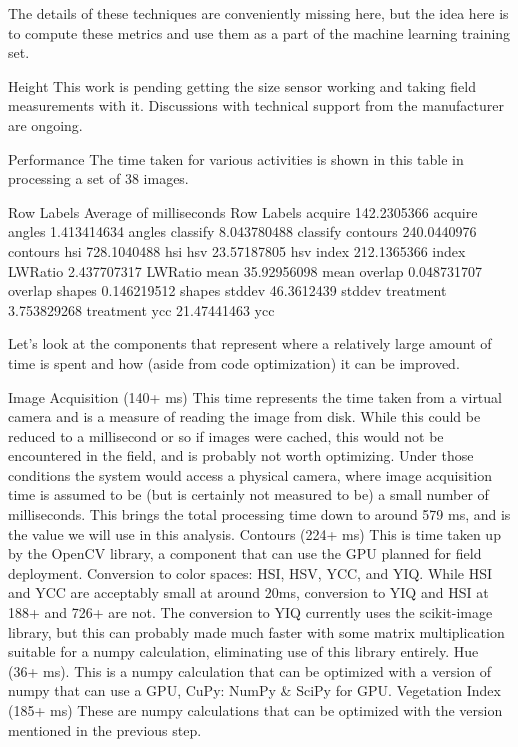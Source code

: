\documentclass[letterpaper]{article}
\begin{document}
The details of these techniques are conveniently missing here, but the idea here is to compute these metrics and use them as a part of the machine learning training set.

Height
This work is pending getting the size sensor working and taking field measurements with it. Discussions with technical support from the manufacturer are ongoing.

Performance
The time taken for various activities is shown in this table in processing a set of 38 images.








Row Labels
Average of milliseconds
Row Labels
acquire
142.2305366
acquire
angles
1.413414634
angles
classify
8.043780488
classify
contours
240.0440976
contours
hsi
728.1040488
hsi
hsv
23.57187805
hsv
index
212.1365366
index
LWRatio
2.437707317
LWRatio
mean
35.92956098
mean
overlap
0.048731707
overlap
shapes
0.146219512
shapes
stddev
46.3612439
stddev
treatment
3.753829268
treatment
ycc
21.47441463
ycc














Let’s look at the components that represent where a relatively large amount of time is spent and how (aside from code optimization) it can be improved.

Image Acquisition (140+ ms) This time represents the time taken from a virtual camera and is a measure of reading the image from disk. While this could be reduced to a millisecond or so if images were cached, this would not be encountered in the field, and is probably not worth optimizing. Under those conditions the system would access a physical camera, where image acquisition time is assumed to be (but is certainly not measured to be) a small number of milliseconds. This brings the total processing time down to around 579 ms, and is the value we will use in this analysis.
Contours (224+ ms) This is time taken up by the OpenCV library, a component that can use the GPU planned for field deployment.
Conversion to color spaces: HSI, HSV, YCC, and YIQ.  While HSI and YCC are acceptably small at around 20ms, conversion to YIQ and HSI at 188+ and 726+  are not. The  conversion to YIQ currently uses the scikit-image library, but this can probably made much faster with some matrix multiplication suitable for a numpy calculation, eliminating use of this library entirely.
Hue (36+ ms). This is a numpy calculation that can be optimized with a version of numpy that can use a GPU, CuPy: NumPy \& SciPy for GPU.
Vegetation Index (185+ ms) These are numpy calculations that can be optimized with the version mentioned in the previous step.
\end{document}
